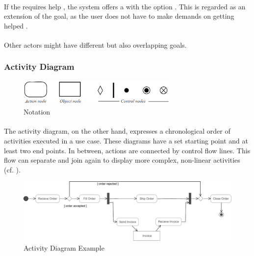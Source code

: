 \paragraph{} If the  requires help , the system offers a  with the option . This is regarded as an extension of the goal, as the user does not have to make demands on getting helped \parencite[cf.][638-639]{ObjectManagementGroup.01.03.2015}.

\paragraph{} 
Other actors might have different but also overlapping goals.


\subsubsection{Activity Diagram}

\begin{figure}[H]
    \centering
    \includegraphics[width=0.7\textwidth]{img/ActivitySymbols.pdf}
    \caption{Notation}\label{fig:adSymb}
\end{figure}

\paragraph{} The activity diagram, on the other hand, expresses a chronological order of activities executed in a use case. These diagrams have a set starting point and at least two end points. In between, actions are connected by control flow lines. This flow can separate and join again to display more complex, non-linear activities  (cf. ).

\begin{figure}[H]
    \centering
    \includegraphics[width=\textwidth]{img/ActivityExample.pdf}
    \caption{Activity Diagram Example \parencite[380]{ObjectManagementGroup.01.03.2015}}\label{fig:adEx}
\end{figure}

